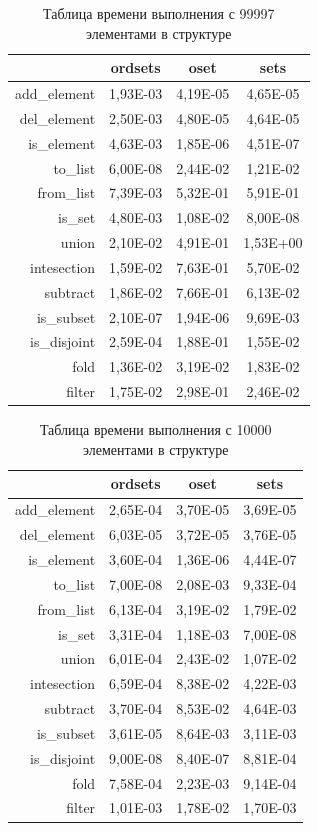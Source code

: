 	\begin{table}
	\centering
	\caption{Таблица времени выполнения с 99997 элементами в структуре}
	\begin{tabular} {|r|c|c|c|}
	\hline
 				& ordsets 	& oset		& sets \\
 	\hline
add\_element	& 1,93E-03	& 4,19E-05	& 4,65E-05 \\
del\_element	& 2,50E-03	& 4,80E-05	& 4,64E-05 \\
is\_element		& 4,63E-03	& 1,85E-06	& 4,51E-07 \\
to\_list		& 6,00E-08	& 2,44E-02	& 1,21E-02 \\
from\_list		& 7,39E-03	& 5,32E-01	& 5,91E-01 \\
is\_set			& 4,80E-03	& 1,08E-02	& 8,00E-08 \\
union			& 2,10E-02	& 4,91E-01	& 1,53E+00 \\
intesection		& 1,59E-02	& 7,63E-01	& 5,70E-02 \\
subtract		& 1,86E-02	& 7,66E-01	& 6,13E-02 \\
is\_subset		& 2,10E-07	& 1,94E-06	& 9,69E-03 \\
is\_disjoint	& 2,59E-04	& 1,88E-01	& 1,55E-02 \\
fold			& 1,36E-02	& 3,19E-02	& 1,83E-02 \\
filter			& 1,75E-02	& 2,98E-01	& 2,46E-02 \\
	\hline
	\end{tabular}
	\end{table}

	\begin{table}
	\centering
	\caption{Таблица времени выполнения с 10000 элементами в структуре}
	\begin{tabular} {|r|c|c|c|}
	\hline
 				& ordsets 	& oset		& sets \\
	\hline
add\_element	& 2,65E-04	& 3,70E-05	& 3,69E-05 \\
del\_element	& 6,03E-05	& 3,72E-05	& 3,76E-05 \\
is\_element		& 3,60E-04	& 1,36E-06	& 4,44E-07 \\
to\_list		& 7,00E-08	& 2,08E-03	& 9,33E-04 \\
from\_list		& 6,13E-04	& 3,19E-02	& 1,79E-02 \\
is\_set			& 3,31E-04	& 1,18E-03	& 7,00E-08 \\
union			& 6,01E-04	& 2,43E-02	& 1,07E-02 \\
intesection		& 6,59E-04	& 8,38E-02	& 4,22E-03 \\
subtract		& 3,70E-04	& 8,53E-02	& 4,64E-03 \\
is\_subset		& 3,61E-05	& 8,64E-03	& 3,11E-03 \\
is\_disjoint	& 9,00E-08	& 8,40E-07	& 8,81E-04 \\
fold			& 7,58E-04	& 2,23E-03	& 9,14E-04 \\
filter			& 1,01E-03	& 1,78E-02	& 1,70E-03 \\
	\hline
	\end{tabular}
	\end{table}
	

